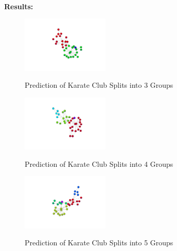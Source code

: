 \documentclass{article}
\begin{document}
		\noindent\\\textbf{Results: }
		\begin{figure}[!htb]
			\centering
			\href{https://github.com/zhangboroy/cs532-s17/blob/master/assg05_submission/group3.png}
			{\includegraphics[width=0.37\textwidth]{group3.png}}
			\label{fig:Prediction of Karate Club Splits into 3 Groups}
			\caption{Prediction of Karate Club Splits into 3 Groups}
			\href{https://github.com/zhangboroy/cs532-s17/blob/master/assg05_submission/group4.png}
			{\includegraphics[width=0.37\textwidth]{group4.png}}
			\label{fig:Prediction of Karate Club Splits into 4 Groups}
			\caption{Prediction of Karate Club Splits into 4 Groups}
			\href{https://github.com/zhangboroy/cs532-s17/blob/master/assg05_submission/group5.png}
			{\includegraphics[width=0.37\textwidth]{group5.png}}
			\label{fig:Prediction of Karate Club Splits into 5 Groups}
			\caption{Prediction of Karate Club Splits into 5 Groups}
		\end{figure}
	
\end{document}
